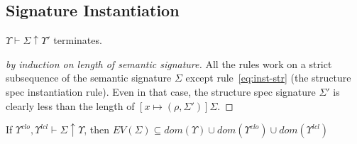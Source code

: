 



\subsection{Signature Instantiation}
\begin{lemma}\label{lem:instterminates}
$\Upsilon\vdash \Sigma \uparrow \Upsilon'$ terminates.
\end{lemma}
\begin{proof}[by induction on length of semantic signature]
All the rules work on a strict subsequence of the semantic signature $\Sigma$ except rule~\ref{eq:inst-str} (the structure spec instantiation rule). Even in that case, the structure spec signature $\Sigma'$ is clearly less than the length of $[x\mapsto(\rho,\Sigma')]\Sigma$. 
\end{proof}

\begin{lemma}\label{lem:installvars}
If $\Upsilon^{clo},\Upsilon^{lcl}\vdash \Sigma \uparrow \Upsilon$, then $EV(\Sigma)\subseteq dom(\Upsilon)\cup dom(\Upsilon^{clo}) \cup dom(\Upsilon^{lcl})$
\end{lemma}

